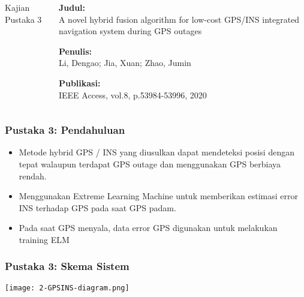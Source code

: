 
\begin{frame}
    \begin{columns}
        \begin{column}{0.35\textwidth}
            \LARGE
            Kajian Pustaka 3
        \end{column}
        \begin{column}{0.6\textwidth}
            \justifying
            \textbf{Judul:}\\
            A novel hybrid fusion algorithm for low-cost GPS/INS integrated navigation system during GPS outages

            \vspace{1.5em}

            \textbf{Penulis:}\\
            Li, Dengao; Jia, Xuan; Zhao, Jumin

            \vspace{1.5em}
            
            \textbf{Publikasi:}\\
            IEEE Access, vol.8, p.53984-53996, 2020
        \end{column}
    \end{columns}
\end{frame}


\begin{frame}
    \frametitle{Pustaka 3: Pendahuluan}
    \large
    \begin{itemize}
        \justifying
        \item Metode hybrid GPS / INS yang diusulkan dapat mendeteksi posisi dengan tepat walaupun terdapat GPS outage dan menggunakan GPS berbiaya rendah.
        \vspace{1em}
        \item Menggunakan Extreme Learning Machine untuk memberikan estimasi error INS terhadap GPS pada saat GPS padam.
        \vspace{1em}
        \item Pada saat GPS menyala, data error GPS digunakan untuk melakukan training ELM
    \end{itemize}
\end{frame}


\begin{frame}
    \frametitle{Pustaka 3: Skema Sistem}
    \centering
    \texttt{[image: 2-GPSINS-diagram.png]}
\end{frame}


